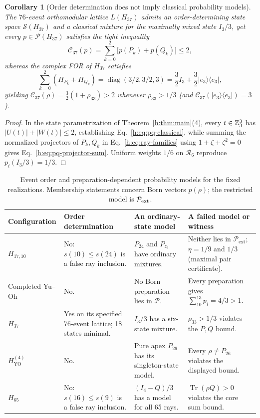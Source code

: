 \documentclass[aps,pra,reprint,superscriptaddress,longbibliography,nofootinbib,floatfix,10pt]{revtex4-2}
\newtheorem{corollary}[theorem]{Corollary}
\theoremstyle{definition}\newtheorem{definition}[theorem]{Definition}
\theoremstyle{remark}\newtheorem{remark}[theorem]{Remark}
\newcommand{\Sc}{\mathcal S}\newcommand{\Cc}{\mathcal C}
\newcommand{\YO}{\mathrm{YO}}\newcommand{\ip}[2]{\langle #1,#2\rangle}
\DeclareMathOperator{\diag}{diag}\DeclareMathOperator{\Tr}{Tr}\DeclareMathOperator{\tr}{tr}
\begin{document}
\begin{corollary}[Order determination does not imply classical probability models]\label{cor:order-probabilities}
The $76$-event orthomodular lattice $L(H_{37})$ admits an order-determining state space $\Sc(H_{37})$ and a classical mixture for the maximally mixed state $I_3/3$, yet every $p\in\mathcal P(H_{37})$ satisfies the tight inequality
\begin{equation}\label{h:eq:pq-classical}
\mathcal C_{37}(p)=\sum_{k=0}^2\bigl[p(P_k)+p(Q_k)\bigr]\le 2,
\end{equation}
whereas the complex FOR of $H_{37}$ satisfies
\begin{equation}\label{h:eq:pq-projector-sum}
\sum_{k=0}^2(\Pi_{P_k}+\Pi_{Q_k})=\diag(3/2,3/2,3)=\frac32I_3+\frac32|e_3\rangle\langle e_3|,
\end{equation}
yielding $\mathcal C_{37}(\rho)=\frac32(1+\rho_{33})>2$ whenever $\rho_{33}>1/3$ (and $\mathcal C_{37}(|e_3\rangle\langle e_3|)=3$).
\end{corollary}
\begin{proof}
In the state parametrization of Theorem~\ref{h:thm:main}(4), every $t\in\mathbb Z_3^3$ has $|U(t)|+|W(t)|\le2$, establishing Eq.~\eqref{h:eq:pq-classical}, while summing the normalized projectors of $P_k,Q_k$ in Eq.~\eqref{h:eq:ray-families} using $1+\zeta+\zeta^2=0$ gives Eq.~\eqref{h:eq:pq-projector-sum}. Uniform weights $1/6$ on $\mathcal R_6$ reproduce $p_i(I_3/3)=1/3$.
\end{proof}

\begin{table}[t]
\centering\small\setlength{\tabcolsep}{3pt}
\caption{Event order and preparation-dependent probability models for the fixed realizations. Membership statements concern Born vectors $p(\rho)$; the restricted model is $\mathcal P_{\rm ext}$.}\label{tab:probability-synthesis}
\begin{tabular}{p{}p{}p{}p{}}\toprule
Configuration & Order determination & An ordinary-state model & A failed model or witness\\\midrule
$H_{17,10}$ & No: $s(10)\le s(24)$ is a false ray inclusion. & $P_{24}$ and $P_{z_3}$ have ordinary mixtures. & Neither lies in $\mathcal P_{\mathrm{ext}}$; $\eta=1/9$ and $1/3$ (maximal pair certificate).\\
Completed Yu--Oh & No. & No Born preparation lies in $\mathcal P$. & Every preparation gives $\sum_{10}^{13}p_i=4/3>1$.\\
$H_{37}$ & Yes on its specified 76-event lattice; 18 states minimal. & $I_3/3$ has a six-state mixture. & $\rho_{33}>1/3$ violates the $P,Q$ bound.\\
$H_{\YO}^{(4)}$ & No. & Pure apex $P_{26}$ has its singleton-state model. & Every $\rho\ne P_{26}$ violates the displayed bound.\\
$H_{65}$ & No: $s(16)\le s(9)$ is a false ray inclusion. & $(I_4-Q)/3$ has a model for all 65 rays. & $\Tr(\rho Q)>0$ violates the core sum bound.\\
\bottomrule\end{tabular}
\end{table}
\end{document}
